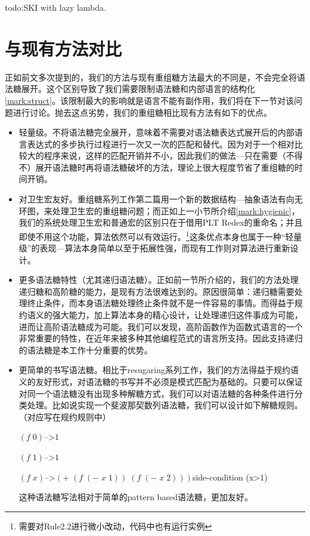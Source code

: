 todo:SKI with lazy lambda.

\section{与现有方法对比}
正如前文多次提到的，我们的方法与现有重组糖方法最大的不同是，不会完全将语法糖展开。这个区别导致了我们需要限制语法糖和内部语言的结构化\ref{mark:struct}。该限制最大的影响就是语言不能有副作用，我们将在下一节对该问题进行讨论。抛去这点劣势，我们的重组糖相比现有方法有如下的优点。
\begin{itemize}
	\item 轻量级。不将语法糖完全展开，意味着不需要对语法糖表达式展开后的内部语言表达式的多步执行过程进行一次又一次的匹配和替代。因为对于一个相对比较大的程序来说，这样的匹配开销并不小，因此我们的做法---只在需要（不得不）展开语法糖时再将语法糖破坏的方法，理论上很大程度节省了重组糖的时间开销。
	\item 对卫生宏友好。重组糖系列工作第二篇用一个新的数据结构---抽象语法有向无环图，来处理卫生宏的重组糖问题；而正如上一小节所介绍\ref{mark:hygienic}，我们的系统处理卫生宏和普通宏的区别只在于借用PLT Redex的重命名；并且即使不用这个功能，算法依然可以有效运行。\footnote{需要对Rule2.2进行微小改动，代码中也有运行实例}这条优点本身也属于一种“轻量级”的表现---算法本身简单以至于拓展性强，而现有工作则对算法进行重新设计。
	\item 更多语法糖特性（尤其递归语法糖）。正如前一节所介绍的，我们的方法处理递归糖和高阶糖的能力，是现有方法很难达到的。原因很简单：递归糖需要处理终止条件，而本身语法糖处理终止条件就不是一件容易的事情。而得益于规约语义的强大能力，加上算法本身的精心设计，让处理递归这件事成为可能，进而让高阶语法糖成为可能。我们可以发现，高阶函数作为函数式语言的一个非常重要的特性，在近年来被多种其他编程范式的语言所支持。因此支持递归的语法糖是本工作十分重要的优势。
	\item 更简单的书写语法糖。相比于resugaring系列工作，我们的方法得益于规约语义的友好形式，对语法糖的书写并不必须是模式匹配为基础的。只要可以保证对同一个语法糖没有出现多种解糖方式，我们可以对语法糖的各种条件进行分类处理。比如说实现一个斐波那契数列语法糖，我们可以设计如下解糖规则。（对应写在规约规则中）
	
	$(f\;0)$-->$1$
	
	$(f\;1)$-->$1$
	
	$(f\;x)$-->$(+\;(f\;(-\;x\;1))\;(f\;(-\;x\;2)))$\qquad side-condition (x>1)
	
	这种语法糖写法相对于简单的pattern based语法糖，更加友好。
\end{itemize}
